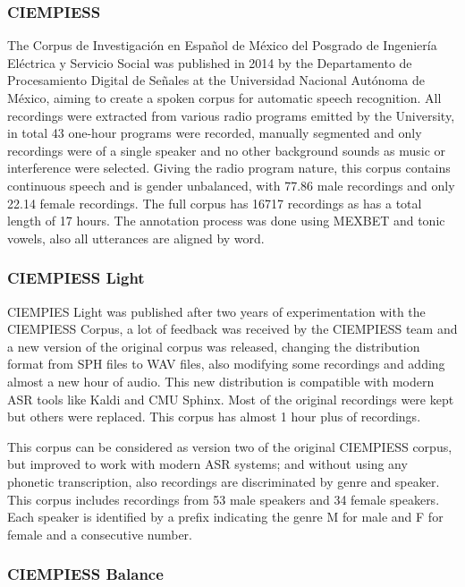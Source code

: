 \documentclass[10pt, a4paper]{article}
\begin{document}
\subsubsection{CIEMPIESS}

The Corpus de Investigación en Español de México del Posgrado de Ingeniería Eléctrica y Servicio Social was published in 2014 by the Departamento de Procesamiento Digital de Señales at the Universidad Nacional Autónoma de México, aiming to create a spoken corpus for automatic speech recognition. All recordings were extracted from various radio programs emitted by the University, in total 43 one-hour programs were recorded, manually segmented and only recordings were of a single speaker and no other background sounds as music or interference were selected. Giving the radio program nature, this corpus contains continuous speech and is gender unbalanced, with 77.86 male recordings and only 22.14 female recordings. The full corpus has 16717 recordings as has a total length of 17 hours. The annotation process was done using MEXBET and tonic vowels, also all utterances are aligned by word.

\subsubsection{CIEMPIESS Light}

CIEMPIES Light was published after two years of experimentation with the CIEMPIESS Corpus, a lot of feedback was received by the CIEMPIESS team and a new version of the original corpus was released, changing the distribution format from SPH files to WAV files, also modifying some recordings and adding almost a new hour of audio. This new distribution is compatible with modern ASR tools like Kaldi and CMU Sphinx. Most of the original recordings were kept but others were replaced. This corpus has almost 1 hour plus of recordings.

This corpus can be considered as version two of the original CIEMPIESS corpus, but improved to work with modern ASR systems; and without using any phonetic transcription, also recordings are discriminated by genre and speaker. This corpus includes recordings from 53 male speakers and 34 female speakers. Each speaker is identified by a prefix indicating the genre M for male and F for female and a consecutive number.

\subsubsection{CIEMPIESS Balance}
\end{document}
